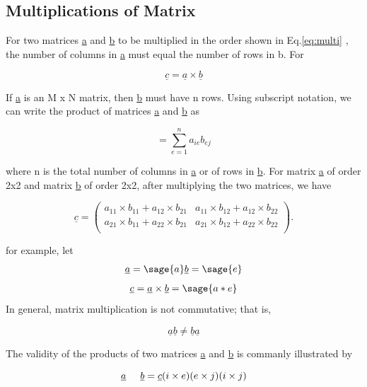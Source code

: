 \documentclass[12pt]{report}
\newcommand{\lab}[1]{
Eq.\ref{#1}
}
\begin{document}
\subsection{Multiplications of Matrix}
For two matrices \underline{a} and \underline{b} to be multiplied in the order shown in \lab{eq:multi}, the number of columns in \underline{a} must equal the number of rows in b. For

\begin{equation}\underline{c} = \underline{a} \times \underline{b}\label{eq:multi}\end{equation}

If \underline{a} is an M x N matrix, then \underline{b} must have n
rows. Using subscript notation, we can write the product of matrices
\underline{a} and \underline{b} as

\begin{equation}[c_{{ij}}] = \sum_{e=1}^{n} {a_{ie}}{b_{ej}}\end  {equation}

where n is the total number of columns in \underline{a} or of rows in
\underline{b}. For matrix \underline{a} of order 2x2 and matrix
\underline{b} of order 2x2, after multiplying the two matrices, we
have

\begin{equation}\underline{c}=\left(\begin{array}{rrrrrr}
a_{11} \times b_{11} + a_{12} \times b_{21} & a_{11} \times b_{12} + a_{12} \times b_{22}\\
a_{21} \times b_{11} + a_{22} \times b_{21} & a_{21} \times b_{12} + a_{22} \times b_{22}\\
\end{array}\right).\end{equation}

for example, let 
$$
\underline{a} = \sage{a}\nonumber 
\underline{b} = \sage{e}\nonumber
$$
\begin{eqnarray}
\underline{c} =\underline{a} \times \underline{b} = \sage{a*e}
\end{eqnarray}
In general, matrix multiplication is not commutative; that is,

\begin{equation}\underline{a}\underline{b} \neq \underline{b}\underline{a} \end{equation}

The validity of the products of two matrices \underline{a} and
\underline{b} is commanly illustrated by

\begin{equation} \underline{a} \hspace{0.5cm} \underline{b} = \underline{c} \nonumber \\(i \times e)(e \times j) (i \times j) \label{eq:genmulti}
\end{equation}
\end{document}
